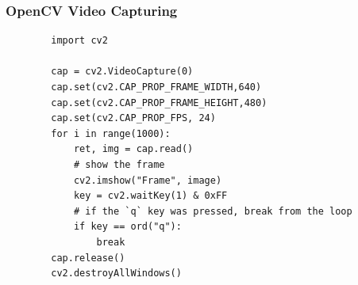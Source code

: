 \documentclass[12pt,letterpaper]{beamer}
\begin{document}
\begin{frame}[fragile]
    \frametitle{OpenCV Video Capturing}
    \scriptsize
    \begin{verbatim} 
        import cv2

        cap = cv2.VideoCapture(0)
        cap.set(cv2.CAP_PROP_FRAME_WIDTH,640)
        cap.set(cv2.CAP_PROP_FRAME_HEIGHT,480)
        cap.set(cv2.CAP_PROP_FPS, 24)
        for i in range(1000):
            ret, img = cap.read()
            # show the frame
            cv2.imshow("Frame", image)
            key = cv2.waitKey(1) & 0xFF
            # if the `q` key was pressed, break from the loop
            if key == ord("q"):
                break
        cap.release()
        cv2.destroyAllWindows()
    \end{verbatim} 
\end{frame}
\end{document}
